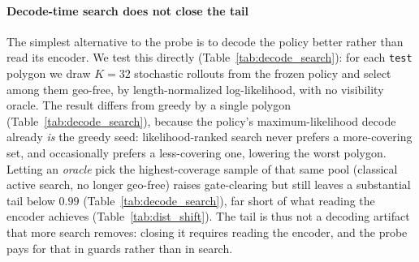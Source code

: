 \documentclass[11pt]{article}
\newcommand{\SetPredictor}{\textup{\textsc{SetPredictor}}}
\begin{document}
\paragraph{Decode-time search does not close the tail} The simplest alternative to the probe is to decode the policy better rather than read its encoder. We test this directly (Table~\ref{tab:decode_search}): for each \texttt{test} polygon we draw $K = 32$ stochastic rollouts from the frozen policy and select among them geo-free, by length-normalized log-likelihood, with no visibility oracle. The result differs from greedy by a single polygon (Table~\ref{tab:decode_search}), because the policy's maximum-likelihood decode already \emph{is} the greedy seed: likelihood-ranked search never prefers a more-covering set, and occasionally prefers a less-covering one, lowering the worst polygon. Letting an \emph{oracle} pick the highest-coverage sample of that same pool (classical active search, no longer geo-free) raises gate-clearing but still leaves a substantial tail below $0.99$ (Table~\ref{tab:decode_search}), far short of what reading the encoder achieves (Table~\ref{tab:dist_shift}). The tail is thus not a decoding artifact that more search removes: closing it requires reading the encoder, and the probe pays for that in guards rather than in search.

\begin{table}[!ht]
  \centering
  \footnotesize
  \caption{Decode-time search on \texttt{test} ($362$ polygons), all reading the same frozen PO/BT policy. \emph{greedy} is the seed of Table~\ref{tab:headline}. \emph{best-of-$32$, likelihood} draws $K=32$ stochastic rollouts and keeps the one with the highest length-normalized log-likelihood, a geo-free decode search with no visibility oracle. \emph{best-of-$32$, coverage oracle} instead keeps the highest-coverage sample (tie-break: fewer guards); it consults exact coverage to choose and is therefore \emph{not} geo-free, reported only as an upper bound on what the policy's own samples contain. Greedy is included in each candidate pool, so neither selection can underperform it on its own ranking metric. Geo-free search matches greedy and does not close the tail; even oracle-assisted search falls well short of the \SetPredictor{} (Table~\ref{tab:dist_shift}).}
  \label{tab:decode_search}
\end{table}
\end{document}
